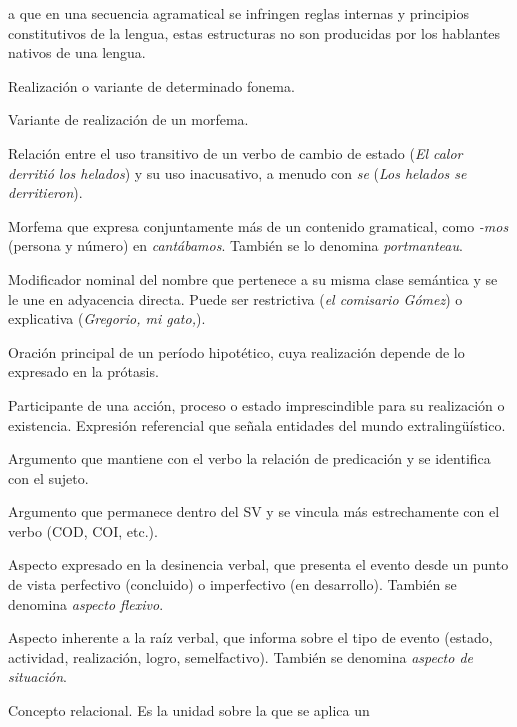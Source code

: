 \begin{glosariogeneral}
        a que en una secuencia agramatical se infringen reglas internas y
        principios constitutivos de la lengua, estas estructuras no son
        producidas por los hablantes nativos de una lengua.
  \item[Alófono:] Realización o variante de determinado fonema.
  \item[Alomorfo:] Variante de realización de un morfema.
  \item[Alternancia causativa-anticausativa:] Relación entre el uso transitivo
        de un verbo de cambio de estado (\textit{El calor derritió los helados})
        y su uso inacusativo, a menudo con \textit{se} (\textit{Los helados se
        derritieron}).
  \item[Amalgama:] Morfema que expresa conjuntamente más de un contenido
        gramatical, como \textit{-mos} (persona y número) en \textit{cantábamos}.
        También se lo denomina \textit{portmanteau}.
  \item[Aposición:] Modificador nominal del nombre que pertenece a su misma
        clase semántica y se le une en adyacencia directa. Puede ser restrictiva
        (\textit{el comisario Gómez}) o explicativa (\textit{Gregorio, mi
        gato,}).
  \item[Apódosis:] Oración principal de un período hipotético, cuya realización
        depende de lo expresado en la prótasis.
  \item[Argumento:] Participante de una acción, proceso o estado imprescindible
        para su realización o existencia. Expresión referencial que señala
        entidades del mundo extralingüístico.
  \item[Argumento externo:] Argumento que mantiene con el verbo la relación de
        predicación y se identifica con el sujeto.
  \item[Argumento interno:] Argumento que permanece dentro del SV y se vincula
        más estrechamente con el verbo (COD, COI, etc.).
  \item[Aspecto gramatical:] Aspecto expresado en la desinencia verbal, que
        presenta el evento desde un punto de vista perfectivo (concluido) o
        imperfectivo (en desarrollo). También se denomina \textit{aspecto
        flexivo}.
  \item[Aspecto léxico:] Aspecto inherente a la raíz verbal, que informa sobre
        el tipo de evento (estado, actividad, realización, logro, semelfactivo).
        También se denomina \textit{aspecto de situación}.
  \item[Base:] Concepto relacional. Es la unidad sobre la que se aplica un

\end{glosariogeneral}
